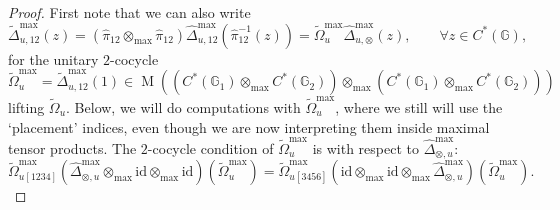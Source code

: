 \documentclass[reqno]{amsart}
\numberwithin{equation}{section}
\newcommand{\id}{\mathrm{id}}
\newcommand{\G}{\mathbb{G}}
\newcommand{\Mult}{\operatorname{M}}
\begin{document}
\begin{proof}
First note that we can also write 
\[
\widetilde{\Delta}^{\max}_{u,12}(z)=(\hat{\pi}_{12}\otimes_{\max} \hat{\pi}_{12})\hat{\Delta}_{u,12}^{\max}(\hat{\pi}_{12}^{-1}(z))  = \widetilde{\Omega}_u^{\max}\hat{\Delta}_{u,\otimes}^{\max}(z),\qquad \forall z \in C^*(\G),
\]
for the unitary $2$-cocycle
\[
\widetilde{\Omega}^{\max}_u = \widetilde{\Delta}_{u,12}^{\max}(1)\in \Mult(( C^*(\G_1)\otimes_{\max} C^*(\G_2))\otimes_{\max} ( C^*(\G_1)\otimes_{\max} C^*(\G_2)))
\]
lifting $\widetilde{\Omega}_u$. Below, we will do computations with $\widetilde{\Omega}_u^{\max}$, where we still will use the `placement' indices, even though we are now interpreting them inside maximal tensor products. The $2$-cocycle condition of $\widetilde{\Omega}_u^{\max}$ is with respect to $\hat{\Delta}_{\otimes,u}^{\max}$:
\begin{equation}\label{EqCocycIdWrittenOut}
\widetilde{\Omega}_{u[1234]}^{\max}(\hat{\Delta}_{\otimes,u}^{\max}\otimes_{\max} \id \otimes_{\max} \id )(\widetilde{\Omega}_u^{\max}) = \widetilde{\Omega}_{u[3456]}^{\max}(\id \otimes_{\max} \id \otimes_{\max} \hat{\Delta}_{\otimes,u}^{\max})(\widetilde{\Omega}_u^{\max}).
\end{equation}


\end{proof}
\end{document}
